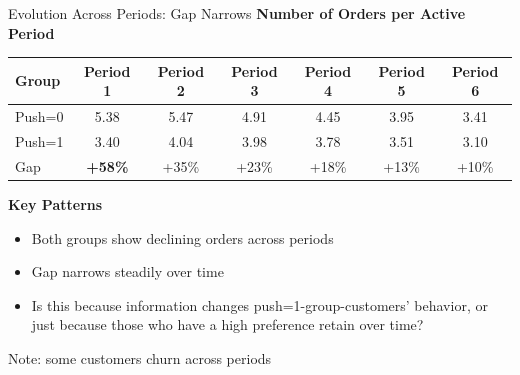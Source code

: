 \documentclass[aspectratio=169]{beamer}  %
\begin{document}
\begin{frame}{Evolution Across Periods: Gap Narrows}
\textbf{Number of Orders per Active Period}
\begin{table}
\centering
\begin{tabular}{lcccccc}
\toprule
Group & Period 1 & Period 2 & Period 3 & Period 4 & Period 5 & Period 6 \\
\midrule
Push=0 & 5.38 & 5.47 & 4.91 & 4.45 & 3.95 & 3.41 \\
Push=1 & 3.40 & 4.04 & 3.98 & 3.78 & 3.51 & 3.10 \\
\midrule
Gap & \textbf{+58\%} & +35\% & +23\% & +18\% & +13\% & +10\% \\
\bottomrule
\end{tabular}
\end{table}

\textbf{Key Patterns}
\begin{itemize}
    \item Both groups show declining orders across periods
    \item Gap narrows steadily over time
    \item Is this because information changes push=1-group-customers' behavior, or just because those who have a high preference retain over time?
\end{itemize}

\vspace{0.2cm}
\scriptsize{Note: some customers churn across periods}
\end{frame}
\end{document}
